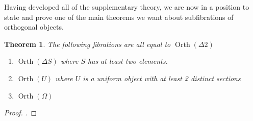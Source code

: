 \documentclass[12pt]{amsart}
\newcommand{\todo}[1]{{\color{red}{\LARGE #1}}}
\DeclareMathOperator{\orth}{Orth}
\newtheorem{thm}{Theorem}[section]
\begin{document}
Having developed all of the supplementary theory, we are now in a
position to state and prove one of the main theorems we want about
subfibrations of orthogonal objects.
\begin{thm}\label{thm:orth:allequiv}
  The following fibrations are all equal to $\orth(\Delta 2)$
  \begin{enumerate}
  \item $\orth(\Delta S)$ where $S$ has at least two elements.
  \item $\orth(U)$ where $U$ is a uniform object with at least 2
    distinct sections
  \item $\orth(\Omega)$
  \end{enumerate}
\end{thm}
\begin{proof}
  \todo{Should prove this in full}.
\end{proof}
\end{document}
